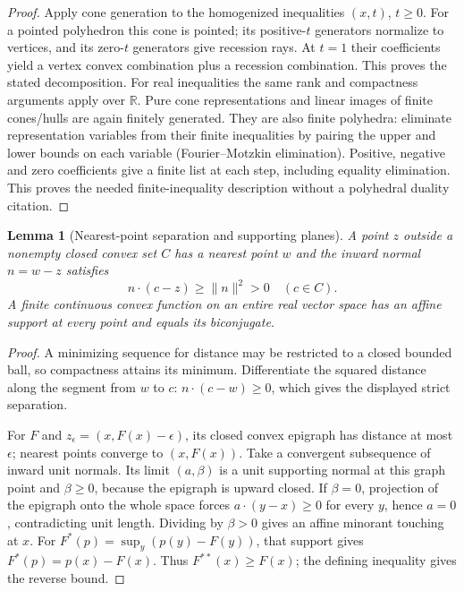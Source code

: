\documentclass[11pt]{article}
\newtheorem{lemma}[theorem]{Lemma}
\newcommand{\R}{\mathbb R}
\begin{document}
\begin{proof}
Apply cone generation to the homogenized inequalities $(x,t)$, $t\geq0$. For a pointed polyhedron this cone is pointed; its positive-$t$ generators normalize to vertices, and its zero-$t$ generators give recession rays. At $t=1$ their coefficients yield a vertex convex combination plus a recession combination. This proves the stated decomposition. For real inequalities the same rank and compactness arguments apply over $\R$. Pure cone representations and linear images of finite cones/hulls are again finitely generated. They are also finite polyhedra: eliminate representation variables from their finite inequalities by pairing the upper and lower bounds on each variable (Fourier--Motzkin elimination). Positive, negative and zero coefficients give a finite list at each step, including equality elimination. This proves the needed finite-inequality description without a polyhedral duality citation.
\end{proof}

\begin{lemma}[Nearest-point separation and supporting planes]\label{lem:support}
A point $z$ outside a nonempty closed convex set $C$ has a nearest point $w$ and the inward normal $n=w-z$ satisfies
\[
 n\cdot(c-z)\geq\|n\|^2>0\quad(c\in C).
\]
A finite continuous convex function on an entire real vector space has an affine support at every point and equals its biconjugate.
\end{lemma}
\begin{proof}
A minimizing sequence for distance may be restricted to a closed bounded ball, so compactness attains its minimum. Differentiate the squared distance along the segment from $w$ to $c$: $n\cdot(c-w)\geq0$, which gives the displayed strict separation.

For $F$ and $z_\epsilon=(x,F(x)-\epsilon)$, its closed convex epigraph has distance at most $\epsilon$; nearest points converge to $(x,F(x))$. Take a convergent subsequence of inward unit normals. Its limit $(a,\beta)$ is a unit supporting normal at this graph point and $\beta\geq0$, because the epigraph is upward closed. If $\beta=0$, projection of the epigraph onto the whole space forces $a\cdot(y-x)\geq0$ for every $y$, hence $a=0$, contradicting unit length. Dividing by $\beta>0$ gives an affine minorant touching at $x$. For $F^*(p)=\sup_y(p(y)-F(y))$, that support gives $F^*(p)=p(x)-F(x)$. Thus $F^{**}(x)\geq F(x)$; the defining inequality gives the reverse bound.
\end{proof}
\end{document}
